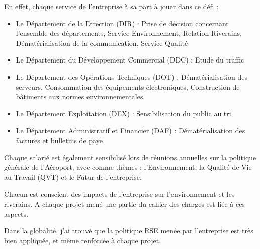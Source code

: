 En effet, chaque service de l'entreprise à sa part à jouer dans ce défi :

\begin{itemize}
    \item Le Département de la Direction (DIR) : Prise de décision concernant l'ensemble des départements, Service Environnement, Relation Riverains, Dématérialisation de la communication, Service Qualité
    \item Le Département du Développement Commercial (DDC) : Etude du traffic
    \item Le Département des Opérations Techniques (DOT) : Dématérialisation des serveurs, Consommation des équipements électroniques, Construction de bâtiments aux normes environnementales
    \item Le Département Exploitation (DEX) : Sensibilisation du public au tri
    \item Le Département Administratif et Financier (DAF) : Dématérialisation des factures et bulletins de paye\newline
\end{itemize}

Chaque salarié est également sensibilisé lors de réunions annuelles sur la politique générale de l'Aéroport, avec comme thèmes : l'Environnement, la Qualité de Vie au Travail (QVT) et le Futur de l'entreprise.

Chacun est conscient des impacts de l'entreprise sur l'environnement et les riverains. A chaque projet mené une partie du cahier des charges est liée à ces aspects.

Dans la globalité, j’ai trouvé que la politique RSE menée par l’entreprise est très bien appliquée, et même renforcée à chaque projet.
